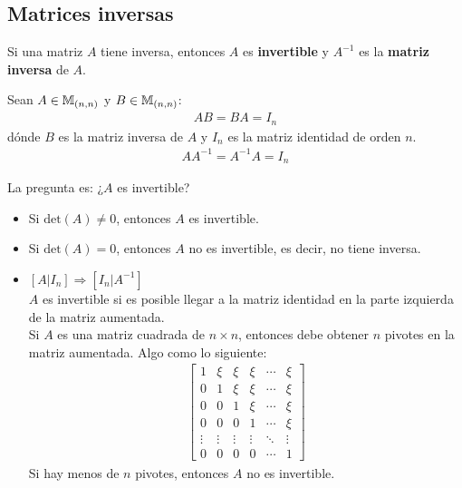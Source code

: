 \subsection{Matrices inversas}
\label{sec:matrices_inversas}

Si una matriz $A$ tiene inversa, entonces $A$ es \textbf{invertible} y $A^{-1}$ es la \textbf{matriz inversa} de $A$.

\begin{definition}
{
    \label{def:1.2.3}
    Sean $A \in \mathbb{M}_{(n, n)}$ y $B \in \mathbb{M}_{(n, n)}$:
    \begin{align*}
        AB = BA = I_n
    \end{align*}
    dónde $B$ es la matriz inversa de $A$ y $I_n$ es la matriz identidad de orden $n$.
    \begin{align*}
        AA^{-1} = A^{-1}A = I_n
    \end{align*}
}    
\end{definition}

La pregunta es: ¿$A$ es invertible?

\begin{itemize}
    \item Si $\text{det}(A) \neq 0$, entonces $A$ es invertible.
    \item Si $\text{det}(A) = 0$, entonces $A$ no es invertible, es decir, no tiene inversa.
    \item $\left[ A | I_n \right] \Longrightarrow \left[ I_n | A^{-1} \right]$ \\ $A$ es invertible si es posible llegar a la matriz identidad en la parte izquierda de la matriz aumentada. \\ Si $A$ es una matriz cuadrada de $n \times n$, entonces debe obtener $n$ pivotes en la matriz aumentada. Algo como lo siguiente: \\ \begin{align*}
        \begin{bmatrix}
            1 & \xi & \xi & \xi & \cdots & \xi \\
            0 & 1 & \xi & \xi & \cdots & \xi \\
            0 & 0 & 1 & \xi & \cdots & \xi \\
            0 & 0 & 0 & 1 & \cdots & \xi \\
            \vdots & \vdots & \vdots & \vdots & \ddots & \vdots \\
            0 & 0 & 0 & 0 & \cdots & 1
        \end{bmatrix}
    \end{align*}
    Si hay menos de $n$ pivotes, entonces $A$ no es invertible.
\end{itemize}

